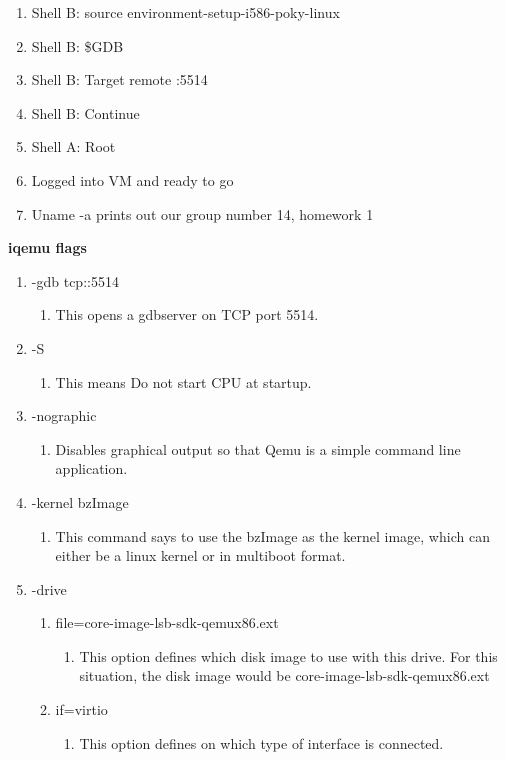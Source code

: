 \documentclass[letterpaper,10pt,fleqn]{article}
\begin{document}
\begin{enumerate}
	\item Shell B: source environment-setup-i586-poky-linux
	\item Shell B: \$GDB
	\item Shell B: Target remote :5514
	\item Shell B: Continue
	\item Shell A: Root
	\item Logged into VM and ready to go
	\item Uname -a prints out our group number 14, homework 1
	\end{enumerate}

\textbf{iqemu flags}
\begin{enumerate}

\item -gdb tcp::5514
	\begin{enumerate}
		\item 	This opens a gdbserver on TCP port 5514.
	\end{enumerate}

\item -S
	\begin{enumerate}
		\item 	This means Do not start CPU at startup.
	\end{enumerate}

\item -nographic
	\begin{enumerate}
		\item 	Disables graphical output so that Qemu is a simple command line application.
	\end{enumerate}

\item -kernel bzImage
	\begin{enumerate}
		\item 	This command says to use the bzImage as the kernel image, which can either be a linux kernel or in multiboot format.
	\end{enumerate}

\item -drive
	\begin{enumerate}
		\item file=core-image-lsb-sdk-qemux86.ext
			\begin{enumerate}
				\item This option defines which disk image to use with this drive. For this situation, the disk image would be core-image-lsb-sdk-qemux86.ext
			\end{enumerate}
		\item if=virtio
			\begin{enumerate}
				\item This option defines on which type of interface is connected. 
			\end{enumerate}
	\end{enumerate}


\end{enumerate}
\end{document}
